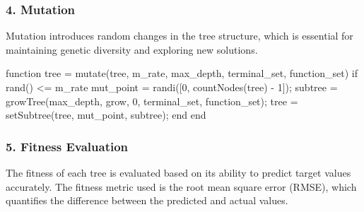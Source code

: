 \documentclass[
  letterpaper,
  DIV=11,
  numbers=noendperiod]{scrartcl}
\newenvironment{Shaded}{\begin{snugshade}}{\end{snugshade}}
\newcommand{\FloatTok}[1]{\textcolor[rgb]{0.68,0.00,0.00}{#1}}
\newcommand{\KeywordTok}[1]{\textcolor[rgb]{0.00,0.23,0.31}{#1}}
\newcommand{\NormalTok}[1]{\textcolor[rgb]{0.00,0.23,0.31}{#1}}
\newcommand{\OperatorTok}[1]{\textcolor[rgb]{0.37,0.37,0.37}{#1}}
\newcommand{\SpecialStringTok}[1]{\textcolor[rgb]{0.13,0.47,0.30}{#1}}
\newcommand{\VariableTok}[1]{\textcolor[rgb]{0.07,0.07,0.07}{#1}}
\begin{document}
\subsubsection{4. Mutation}\label{mutation}

Mutation introduces random changes in the tree structure, which is
essential for maintaining genetic diversity and exploring new solutions.

\begin{Shaded}
\begin{Highlighting}[]
\KeywordTok{function} \VariableTok{tree} \OperatorTok{=} \VariableTok{mutate}\NormalTok{(}\VariableTok{tree}\OperatorTok{,} \VariableTok{m\_rate}\OperatorTok{,} \VariableTok{max\_depth}\OperatorTok{,} \VariableTok{terminal\_set}\OperatorTok{,} \VariableTok{function\_set}\NormalTok{)}
    \KeywordTok{if} \VariableTok{rand}\NormalTok{() }\OperatorTok{\textless{}=} \VariableTok{m\_rate}
        \VariableTok{mut\_point} \OperatorTok{=} \VariableTok{randi}\NormalTok{([}\FloatTok{0}\OperatorTok{,} \VariableTok{countNodes}\NormalTok{(}\VariableTok{tree}\NormalTok{) }\OperatorTok{{-}} \FloatTok{1}\NormalTok{])}\OperatorTok{;}
        \VariableTok{subtree} \OperatorTok{=} \VariableTok{growTree}\NormalTok{(}\VariableTok{max\_depth}\OperatorTok{,} \SpecialStringTok{\textquotesingle{}grow\textquotesingle{}}\OperatorTok{,} \FloatTok{0}\OperatorTok{,} \VariableTok{terminal\_set}\OperatorTok{,} \VariableTok{function\_set}\NormalTok{)}\OperatorTok{;}
        \VariableTok{tree} \OperatorTok{=} \VariableTok{setSubtree}\NormalTok{(}\VariableTok{tree}\OperatorTok{,} \VariableTok{mut\_point}\OperatorTok{,} \VariableTok{subtree}\NormalTok{)}\OperatorTok{;}
    \KeywordTok{end}
\KeywordTok{end}
\end{Highlighting}
\end{Shaded}

\subsubsection{5. Fitness Evaluation}\label{fitness-evaluation}

The fitness of each tree is evaluated based on its ability to predict
target values accurately. The fitness metric used is the root mean
square error (RMSE), which quantifies the difference between the
predicted and actual values.
\end{document}
